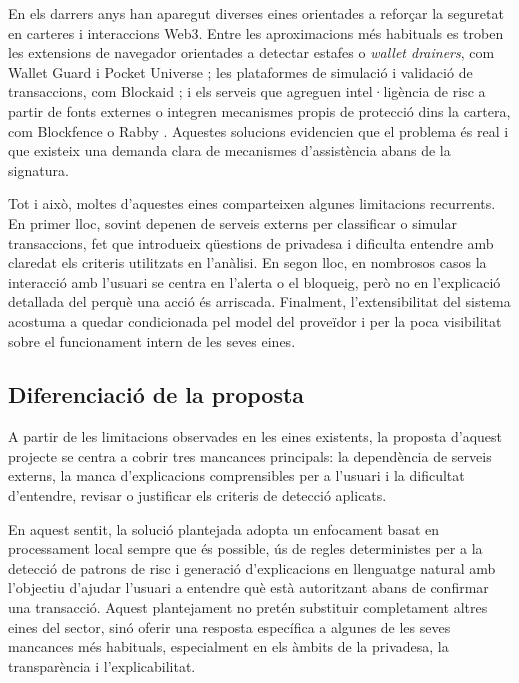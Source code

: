 En els darrers anys han aparegut diverses eines orientades a reforçar la seguretat en carteres i interaccions Web3. Entre les aproximacions més habituals es troben les extensions de navegador orientades a detectar estafes o \textit{wallet drainers}, com Wallet Guard i Pocket Universe \cite{walletguard_official,pocketuniverse_official}; les plataformes de simulació i validació de transaccions, com Blockaid \cite{blockaid_tx_security}; i els serveis que agreguen intel·ligència de risc a partir de fonts externes o integren mecanismes propis de protecció dins la cartera, com Blockfence o Rabby \cite{blockfence_official,rabby_official}. Aquestes solucions evidencien que el problema és real i que existeix una demanda clara de mecanismes d’assistència abans de la signatura.

Tot i això, moltes d’aquestes eines comparteixen algunes limitacions recurrents. En primer lloc, sovint depenen de serveis externs per classificar o simular transaccions, fet que introdueix qüestions de privadesa i dificulta entendre amb claredat els criteris utilitzats en l’anàlisi. En segon lloc, en nombrosos casos la interacció amb l’usuari se centra en l’alerta o el bloqueig, però no en l’explicació detallada del perquè una acció és arriscada. Finalment, l’extensibilitat del sistema acostuma a quedar condicionada pel model del proveïdor i per la poca visibilitat sobre el funcionament intern de les seves eines.

\subsection{Diferenciació de la proposta}

A partir de les limitacions observades en les eines existents, la proposta d’aquest projecte se centra a cobrir tres mancances principals: la dependència de serveis externs, la manca d’explicacions comprensibles per a l’usuari i la dificultat d’entendre, revisar o justificar els criteris de detecció aplicats.

En aquest sentit, la solució plantejada adopta un enfocament basat en processament local sempre que és possible, ús de regles deterministes per a la detecció de patrons de risc i generació d’explicacions en llenguatge natural amb l’objectiu d’ajudar l’usuari a entendre què està autoritzant abans de confirmar una transacció. Aquest plantejament no pretén substituir completament altres eines del sector, sinó oferir una resposta específica a algunes de les seves mancances més habituals, especialment en els àmbits de la privadesa, la transparència i l’explicabilitat.

